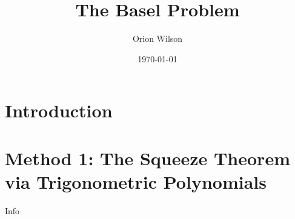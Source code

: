 \documentclass[11pt,reqno, tikz, border=3mm]{amsart}
\title[Evaluation of the Basel Problem]{The Basel Problem}
\author{Orion Wilson}
\date{\today}
\theoremstyle{plain}
\theoremstyle{definition}
\theoremstyle{remark}
\begin{document}
\begin{abstract}

\end{abstract}

\maketitle

\tableofcontents

\section{Introduction}



\section{Method 1: The Squeeze Theorem via Trigonometric Polynomials}
Info

\end{document}
